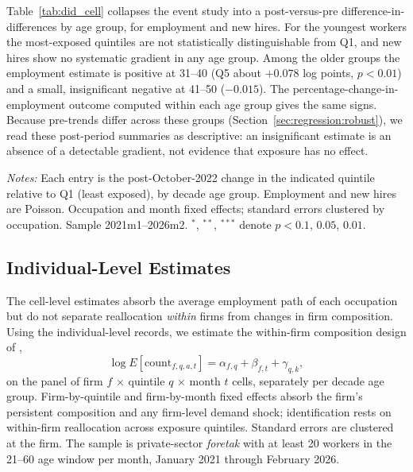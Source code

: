 \documentclass[12pt]{article}
\begin{document}
Table~\ref{tab:did_cell} collapses the event study into a post-versus-pre difference-in-differences by age group, for employment and new hires. For the youngest workers the most-exposed quintiles are not statistically distinguishable from Q1, and new hires show no systematic gradient in any age group. Among the older groups the employment estimate is positive at 31--40 (Q5 about $+0.078$ log points, $p<0.01$) and a small, insignificant negative at 41--50 ($-0.015$). The percentage-change-in-employment outcome computed within each age group gives the same signs. Because pre-trends differ across these groups (Section~\ref{sec:regression:robust}), we read these post-period summaries as descriptive: an insignificant estimate is an absence of a detectable gradient, not evidence that exposure has no effect.

\begin{table}[tp]
  \centering
  \caption{Cell-level difference-in-differences by AI-exposure quintile and decade age group, private sector.}
  \label{tab:did_cell}
  
  \begin{minipage}{\textwidth}\footnotesize\textit{Notes:} Each entry is the post-October-2022 change in the indicated quintile relative to Q1 (least exposed), by decade age group. Employment and new hires are Poisson. Occupation and month fixed effects; standard errors clustered by occupation. Sample 2021m1--2026m2. $^{*}$, $^{**}$, $^{***}$ denote $p<0.1$, $0.05$, $0.01$.\end{minipage}
\end{table}


\subsection{Individual-Level Estimates}\label{sec:regression:firmfe}

The cell-level estimates absorb the average employment path of each occupation but do not separate reallocation \emph{within} firms from changes in firm composition. Using the individual-level records, we estimate the within-firm composition design of \citet{brynjolfsson2025},
\[
\log E[\text{count}_{f,q,a,t}] = \alpha_{f,q} + \beta_{f,t} + \gamma_{q,k},
\]
on the panel of firm $f$ $\times$ quintile $q$ $\times$ month $t$ cells, separately per decade age group. Firm-by-quintile and firm-by-month fixed effects absorb the firm's persistent composition and any firm-level demand shock; identification rests on within-firm reallocation across exposure quintiles. Standard errors are clustered at the firm. The sample is private-sector \emph{foretak} with at least 20 workers in the 21--60 age window per month, January 2021 through February 2026.
\end{document}
